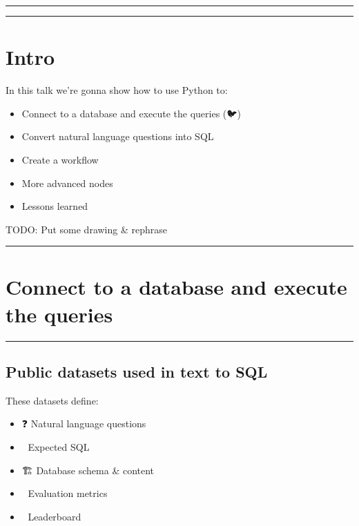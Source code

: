 \documentclass[
  letterpaper,
  DIV=11,
  numbers=noendperiod]{scrartcl}
\providecommand{\tightlist}{%
  \setlength{\itemsep}{0pt}\setlength{\parskip}{0pt}}
\begin{document}
\begin{center}\rule{0.5\linewidth}{0.5pt}\end{center}

\begin{center}\rule{0.5\linewidth}{0.5pt}\end{center}

\section{Intro}\label{intro}

In this talk we're gonna show how to use Python to:

\begin{itemize}
\tightlist
\item
  Connect to a database and execute the queries (🐦)
\item
  Convert natural language questions into SQL
\item
  Create a workflow
\item
  More advanced nodes
\item
  Lessons learned
\end{itemize}

TODO: Put some drawing \& rephrase

\begin{center}\rule{0.5\linewidth}{0.5pt}\end{center}

\section{Connect to a database and execute the
queries}\label{connect-to-a-database-and-execute-the-queries}

\begin{center}\rule{0.5\linewidth}{0.5pt}\end{center}

\subsection{Public datasets used in text to
SQL}\label{public-datasets-used-in-text-to-sql}

These datasets define:

\begin{itemize}
\tightlist
\item
  ❓ Natural language questions
\item
  🫰 Expected SQL
\item
  🏗️ Database schema \& content
\item
  🔎 Evaluation metrics
\item
  🥇 Leaderboard
\end{itemize}
\end{document}
